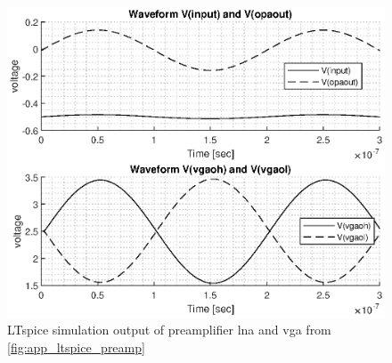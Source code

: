 \begin{figure}[htbp]
	\centering
	\includegraphics[width=.8\textwidth]{Figures/3_preamplifier_sim_out.eps}
	\caption{LTspice simulation output of preamplifier \gls{lna} and \gls{vga} from \cref{fig:app_ltspice_preamp}}
	\label{fig:3_preamplifier_sim}
\end{figure}

